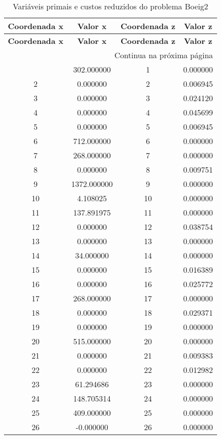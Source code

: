 \documentclass[12pt]{article}
\begin{document}
\begin{longtable}{@{}cccc@{}}
\caption{Variáveis primais e custos reduzidos do problema Boeig2} \\
\toprule
\textbf{Coordenada x} & \textbf{Valor x} & \textbf{Coordenada z} & \textbf{Valor z} \\
\midrule
\endfirsthead

\toprule
\textbf{Coordenada x} & \textbf{Valor x} & \textbf{Coordenada z} & \textbf{Valor z} \\
\midrule
\endhead

\midrule \multicolumn{4}{r}{{Continua na próxima página}} \\ \midrule
\endfoot

\bottomrule
\endlastfoot
1 & 302.000000 & 1 & 0.000000 \\
2 & 0.000000 & 2 & 0.006945 \\
3 & 0.000000 & 3 & 0.024120 \\
4 & 0.000000 & 4 & 0.045699 \\
5 & 0.000000 & 5 & 0.006945 \\
6 & 712.000000 & 6 & 0.000000 \\
7 & 268.000000 & 7 & 0.000000 \\
8 & 0.000000 & 8 & 0.009751 \\
9 & 1372.000000 & 9 & 0.000000 \\
10 & 4.108025 & 10 & 0.000000 \\
11 & 137.891975 & 11 & 0.000000 \\
12 & 0.000000 & 12 & 0.038754 \\
13 & 0.000000 & 13 & 0.000000 \\
14 & 34.000000 & 14 & 0.000000 \\
15 & 0.000000 & 15 & 0.016389 \\
16 & 0.000000 & 16 & 0.025772 \\
17 & 268.000000 & 17 & 0.000000 \\
18 & 0.000000 & 18 & 0.029371 \\
19 & 0.000000 & 19 & 0.000000 \\
20 & 515.000000 & 20 & 0.000000 \\
21 & 0.000000 & 21 & 0.009383 \\
22 & 0.000000 & 22 & 0.012982 \\
23 & 61.294686 & 23 & 0.000000 \\
24 & 148.705314 & 24 & 0.000000 \\
25 & 409.000000 & 25 & 0.000000 \\
26 & -0.000000 & 26 & 0.000000 \\

\end{longtable}
\end{document}
